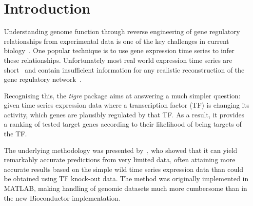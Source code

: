 \documentclass{bioinfo}
\newcommand{\tigre}{\emph{tigre}}
\begin{document}
\section{Introduction}

Understanding genome function through reverse engineering of gene
regulatory relationships from experimental data is one of the key
challenges in current biology~\citep{ENCODE2007,Bickel2009e}.  One
popular technique is to use gene expression time series to infer these
relationships.  Unfortunately most real world expression time series
are short~\citep{Ernst2005} and contain insufficient information for
any realistic reconstruction of the gene regulatory
network~\citep{Smet2010}.

Recognising this, the \tigre{} package aims at answering a much
simpler question: given time series expression data where a
transcription factor (TF) is changing its activity, which genes are
plausibly regulated by that TF.  As a result, it provides a ranking of
tested target genes according to their likelihood of being targets of
the TF.

The underlying methodology was presented by~\citet{Honkela2010PNAS},
who showed that it can yield remarkably accurate predictions from very
limited data, often attaining more accurate results based on the
simple wild time series expression data than could be obtained using
TF knock-out data.  The method was originally implemented in MATLAB,
making handling of genomic datasets much more cumbersome than in the
new Bioconductor implementation.
\end{document}
